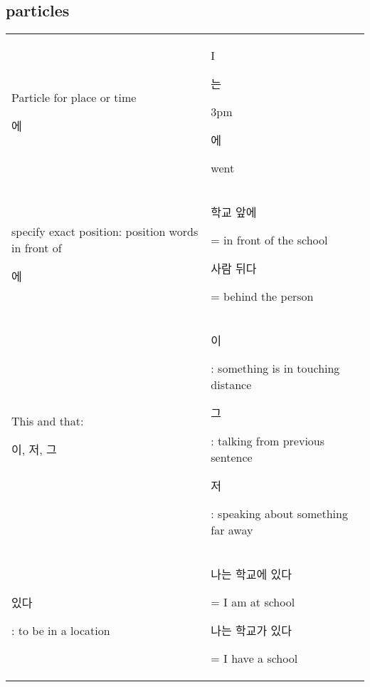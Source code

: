 \subsection{particles}

\begin{tabular}{|p{200pt}p{200pt}|}
\hline
	Particle for place or time \begin{Korean}에\end{Korean} &
	I\begin{Korean}는\end{Korean} 3pm \begin{Korean}에\end{Korean} went\\

	specify exact position: position words in front of \begin{Korean}에\end{Korean} &
	\begin{Korean}학교 앞에\end{Korean} = in front of the school\newline
	\begin{Korean}사람 뒤다\end{Korean} = behind the person\\
\hline
	This and that: \begin{Korean}이, 저, 그\end{Korean}&
	\begin{Korean}이\end{Korean}: something is in touching distance\newline
	\begin{Korean}그\end{Korean}: talking from previous sentence\newline
	\begin{Korean}저\end{Korean}: speaking about something far away\\
\hline
	 \begin{Korean}있다\end{Korean}: to be in a location&
	 \begin{Korean}나는 학교에 있다\end{Korean} = I am at school\newline
	 \begin{Korean}나는 학교가 있다\end{Korean} = I have a school\\
\hline		

\end{tabular}
